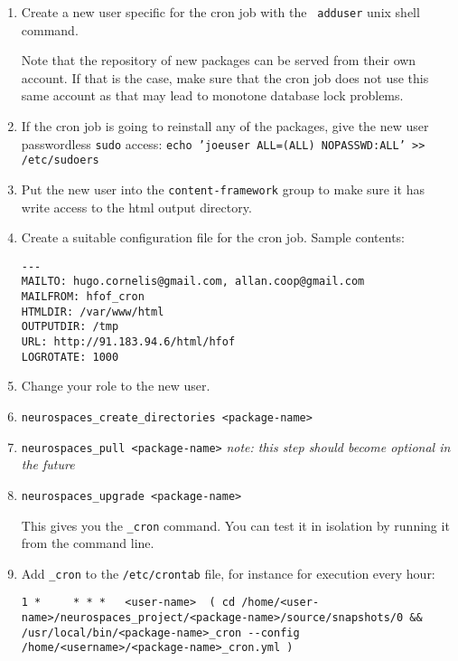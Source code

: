 \documentclass[12pt]{article}
\begin{document}
\begin{enumerate}
\item Create a new user specific for the cron job with the {\tt
    adduser} unix shell command.

  Note that the repository of new packages can be served from their
  own account.  If that is the case, make sure that the cron job does
  not use this same account as that may lead to monotone database lock
  problems.

\item If the cron job is going to reinstall any of the packages, give
  the new user passwordless {\tt sudo} access: {\tt echo 'joeuser
    ALL=(ALL) NOPASSWD:ALL' >> /etc/sudoers}

\item Put the new user into the {\tt content-framework} group to make
  sure it has write access to the html output directory.
\item Create a suitable configuration file for the cron job.  Sample
  contents:
\begin{verbatim}
---
MAILTO: hugo.cornelis@gmail.com, allan.coop@gmail.com
MAILFROM: hfof_cron
HTMLDIR: /var/www/html
OUTPUTDIR: /tmp
URL: http://91.183.94.6/html/hfof
LOGROTATE: 1000
\end{verbatim}
\item Change your role to the new user.
\item {\tt neurospaces\_create\_directories <package-name>}
\item {\tt neurospaces\_pull <package-name>} {\it note: this step should
    become optional in the future}
\item {\tt neurospaces\_upgrade <package-name>}

  This gives you the {\tt <package-name>\_cron} command.  You can test it
  in isolation by running it from the command line.
\item Add {\tt <package-name>\_cron} to the {\tt /etc/crontab} file, for
  instance for execution every hour:

\begin{verbatim}
1 *     * * *   <user-name>  ( cd /home/<user-name>/neurospaces_project/<package-name>/source/snapshots/0 && /usr/local/bin/<package-name>_cron --config /home/<username>/<package-name>_cron.yml )
\end{verbatim}
\end{enumerate}


\end{document}

